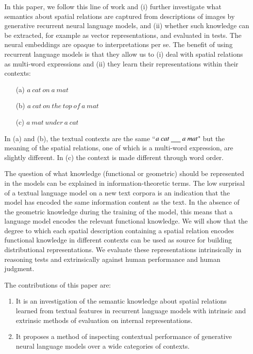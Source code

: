 In this paper, we follow this line of work and %
(i) further investigate what semantics about spatial relations are captured
from descriptions of images by generative recurrent neural language models,
and (ii) whether such knowledge can be
extracted, for example as vector representations, and evaluated in tests.
The neural embeddings are opaque to interpretations per se. The benefit of %
using recurrent language models is that they allow us to (i) deal
with spatial relations as multi-word expressions and (ii) they learn their
representations within their contexts:
\begin{itemize}[noitemsep,topsep=0pt,parsep=0pt,partopsep=0pt]
\item[(a)] $a~cat~on~a~mat$
\item[(b)] $a~cat~on~the~top~of~a~mat$
\item[(c)] $a~mat~under~a~cat$
\end{itemize}
\noindent In (a) and (b), the textual contexts are the same
``$a~cat~\underline{\hspace{0.5cm}}~a~mat$" but the meaning of the spatial
relations, one of which is a multi-word expression, are slightly different.
In (c) the context is made different through word order.

The question of what knowledge (functional or geometric) should be represented
in the models can be explained in information-theoretic terms. The low
surprisal of a textual language model on a new text corpora is an indication
that the model has encoded the same information content as the text.
In the absence of the geometric knowledge during the training of the model,
this means that a language model encodes the relevant functional knowledge. We
will show that the degree to which each spatial description containing a
spatial relation encodes functional knowledge in different contexts can be used
as source for building distributional representations. We evaluate these
representations intrinsically in reasoning tests and extrinsically against
human performance and human judgment.

The contributions of this paper are:
\begin{enumerate}[noitemsep] %
\item It is an investigation of the semantic knowledge about spatial relations learned from textual features in recurrent language models with intrinsic and extrinsic methods of evaluation on internal representations.
\item It proposes a method of inspecting contextual performance of generative neural language models over a wide categories of contexts.
\end{enumerate}

